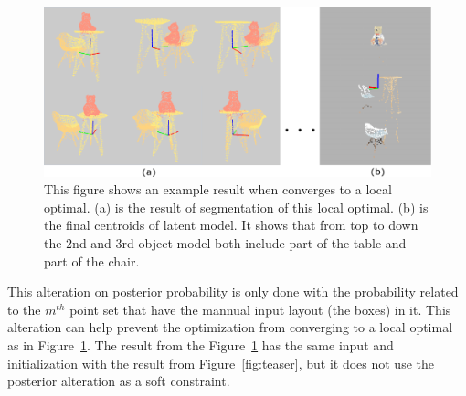 \begin{figure}[htb]
	\centering
	\includegraphics[width=\linewidth]{images/localoptimal/localoptimal}
	\caption{\label{fig:localoptimal}This figure shows an example result when converges to a local optimal. (a) is the result of segmentation of this local optimal. (b) is the final centroids of latent model. It shows that from top to down the 2nd and 3rd object model both include part of the table and part of the chair.}
\end{figure}
This alteration on posterior probability is only done with the probability related to the $m^{th}$ point set that have the mannual input layout (the boxes) in it. This alteration can help prevent the optimization from converging to a local optimal as in Figure~\ref{fig:localoptimal}. The result from the Figure~\ref{fig:localoptimal} has the same input and initialization with the result from Figure~\ref{fig:teaser}, but it does not use the posterior alteration as a soft constraint.

